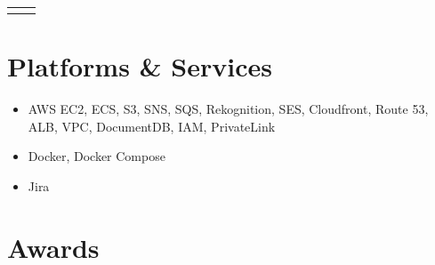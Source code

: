 \documentclass[
	10pt, %
]{FreemanCV}
\begin{document}
\begin{paracol}{2}


\begin{supertabular}{r l} %








\end{supertabular}

\section{Platforms \& Services}
\begin{itemize}
	\item AWS EC2, ECS, S3, SNS, SQS, Rekognition, SES, Cloudfront, Route 53, ALB, VPC, DocumentDB, IAM, PrivateLink
	\item Docker, Docker Compose
	\item Jira
\end{itemize}


\section{Awards}



\end{paracol}
\end{document}
